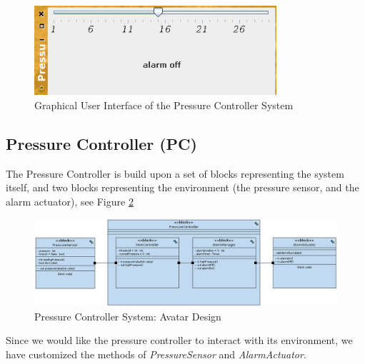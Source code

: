 \documentclass[12pt]{article}
\begin{document}
\begin{figure}[htbp]
\centering
\includegraphics[width=0.8\textwidth]{figures/guipc}
\caption{Graphical User Interface of the Pressure Controller System} \label{fig:guipc}
\end{figure}

\subsection{Pressure Controller (PC)}
The Pressure Controller is build upon a set of blocks representing the system itself, and two blocks representing the environment (the pressure sensor, and the alarm actuator), see Figure \ref{fig:pc}

\begin{figure}[htbp]
\centering
\includegraphics[width=1\textwidth]{figures/PressureController}
\caption{Pressure Controller System: Avatar Design} \label{fig:pc}
\end{figure}

Since we would like the pressure controller to interact with its environment, we have customized the methods of \textit{PressureSensor} and \textit{AlarmActuator}. 
\end{document}
